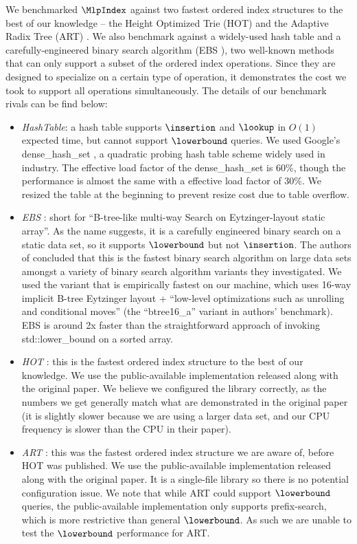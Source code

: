 \documentclass[11pt, usletter]{article}
\begin{document}
We benchmarked $\MlpIndex$ against two fastest ordered index 
structures to the best of our knowledge -- the Height Optimized Trie (HOT) \cite{hot_sigmod18} and the Adaptive Radix Tree (ART) \cite{arttrie_icde13}.
We also benchmark against
a widely-used hash table \cite{densehashset} and a carefully-engineered binary search algorithm (EBS \cite{binary_search_layout}), 
two well-known methods that can only support a subset of the ordered index operations. 
Since they are designed to specialize on a certain type of operation, 
it demonstrates the cost we took to support all operations simultaneously. 
The details of our benchmark rivals can be find below:
\begin{itemize}
[topsep=0pt,partopsep=0pt,itemsep=0pt,parsep=0pt,fullwidth,itemindent=\parindent,listparindent=\parindent]
\item \textit{HashTable}: a hash table supports $\insertion$ and $\lookup$ in $O(1)$ expected time, but cannot support $\lowerbound$ queries.
We used Google's dense\_hash\_set \cite{densehashset},
a quadratic probing hash table scheme widely used in industry.
The effective load factor of the dense\_hash\_set is 60\%, 
though the performance is almost the same with a effective load factor of 30\%.
We resized the table at the beginning to prevent resize cost due to table overflow.
\item \textit{EBS} \cite{binary_search_layout}: short for ``B-tree-like multi-way Search on Eytzinger-layout static array''. 
As the name suggests, it is a carefully engineered binary search on a static data set, 
so it supports $\lowerbound$ but not $\insertion$.
The authors of \cite{binary_search_layout} concluded that this is the fastest binary search algorithm on large data sets 
amongst a variety of binary search algorithm variants they investigated. 
We used the variant that is empirically fastest on our machine, which uses 16-way implicit B-tree Eytzinger layout
+ ``low-level optimizations such as unrolling and conditional moves''
(the ``btree16\_a'' variant in authors' benchmark). 
EBS is around 2x faster than the straightforward approach of invoking std::lower\_bound on a sorted array.
\item \textit{HOT} \cite{hot_sigmod18}: this is the fastest ordered index structure to the best of our knowledge. 
We use the public-available implementation released along with the original paper.
We believe we configured the library correctly,
as the numbers we get generally match what are demonstrated in the original paper (it is slightly slower 
because we are using a larger data set, and our CPU frequency is slower than the CPU in their paper).
\item \textit{ART} \cite{arttrie_icde13}: this was the fastest ordered index structure we are aware of, before HOT was published.
We use the public-available implementation released along with the original paper.
It is a single-file library so there is no potential configuration issue.
We note that while ART could support $\lowerbound$ queries, 
the public-available implementation only supports prefix-search, 
which is more restrictive than general $\lowerbound$. 
As such we are unable to test the $\lowerbound$ performance for ART.
\end{itemize}
\end{document}
